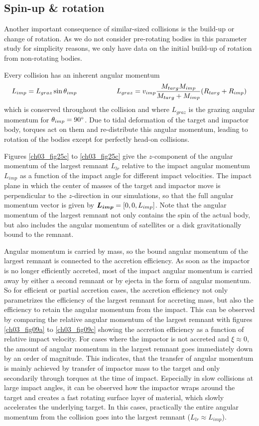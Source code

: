\subsection{Spin-up \& rotation}
Another important consequence of similar-sized collisions is the build-up or change of rotation. As we do not consider pre-rotating bodies in this parameter study for simplicity reasons, we only have data on the initial build-up of rotation from non-rotating bodies.

Every collision has an inherent angular momentum 
\begin{align}
L_{imp} = L_{graz} \sin{ \theta_{imp}} \hspace{2.0cm} L_{graz} = v_{imp} \frac{M_{targ} M_{imp}}{M_{targ} + M_{imp}} (R_{targ} + R_{imp})
\end{align}
which is conserved throughout the collision and where $L_{graz}$ is the grazing angular momentum for $\theta_{imp} = 90 ^\circ$. Due to tidal deformation of the target and impactor body, torques act on them and re-distribute this angular momentum, leading to rotation of the bodies except for perfectly head-on collisions.

Figures \ref{ch03_fig25c} to \ref{ch03_fig25c} give the $z$-component of the angular momentum of the largest remnant $L_{lr}$ relative to the impact angular momentum $L_{imp}$ as a function of the impact angle for different impact velocities. The impact plane in which the center of masses of the target and impactor move is perpendicular to the $z$-direction in our simulations, so that the full angular momentum vector is given by $\boldsymbol{L_{imp}} = [0, 0, L_{imp} ]$. Note that the angular momentum of the largest remnant not only contains the spin of the actual body, but also includes the angular momentum of satellites or a disk gravitationally bound to the remnant.

Angular momentum is carried by mass, so the bound angular momentum of the largest remnant is connected to the accretion efficiency. As soon as the impactor is no longer efficiently accreted, most of the impact angular momentum is carried away by either a second remnant or by ejecta in the form of angular momentum. So for efficient or partial accretion cases, the accretion efficiency not only parametrizes the efficiency of the largest remnant for accreting mass, but also the efficiency to retain the angular momentum from the impact. This can be observed by comparing the relative angular momentum of the largest remnant with figures \ref{ch03_fig09a} to \ref{ch03_fig09c} showing the accretion efficiency as a function of relative impact velocity. For cases where the impactor is not accreted and $\xi \approx 0$, the amount of angular momentum in the largest remnant goes immediately down by an order of magnitude. This indicates, that the transfer of angular momentum is mainly achieved by transfer of impactor mass to the target and only secondarily through torques at the time of impact. Especially in slow collisions at large impact angles, it can be observed how the impactor wraps around the target and creates a fast rotating surface layer of material, which slowly accelerates the underlying target. In this cases, practically the entire angular momentum from the collision goes into the largest remnant ($L_{lr} \approx L_{imp}$).

